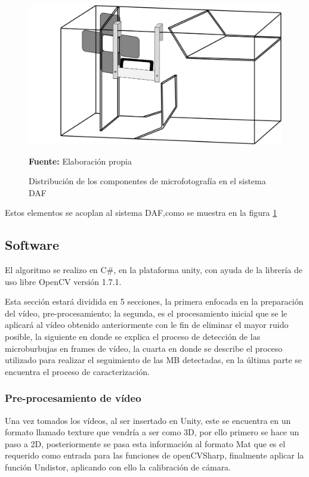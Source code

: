 \documentclass[12pt,twocolumn,a4paper]{article}
\begin{document}
\begin{figure}
	\centering
	\includegraphics[scale=0.45]{Distribucion.png}
	\caption{Distribución de los componentes de microfotografía en el sistema DAF} \textbf{Fuente:} Elaboración propia
	\label{disDAF}
\end{figure}

Estos elementos se acoplan al sistema DAF,como se muestra en la figura \ref{disDAF}

\subsection{Software}
El algoritmo se realizo en C\#, en la plataforma unity, con ayuda de la librería de uso libre OpenCV versión 1.7.1.

Esta sección estará dividida en 5 secciones, la primera enfocada en la preparación del vídeo, pre-procesamiento;  la segunda, es  el procesamiento inicial que se le aplicará al vídeo obtenido anteriormente con le fin de eliminar el mayor ruido posible, la siguiente en donde se explica el proceso de detección de las microburbujas en frames de vídeo, la cuarta  en donde se describe el proceso utilizado para realizar el seguimiento de las MB detectadas, en la última parte se encuentra el proceso de caracterización.



\subsubsection{Pre-procesamiento de vídeo}

Una vez tomados los vídeos, al ser insertado en Unity, este se encuentra en un formato llamado texture que vendría a ser como 3D, por ello primero se hace un paso a 2D, posteriormente se pasa esta información al formato Mat que es el requerido como entrada para las funciones de openCVSharp, finalmente aplicar la función Undistor, aplicando con ello la calibración de cámara.  
\end{document}
